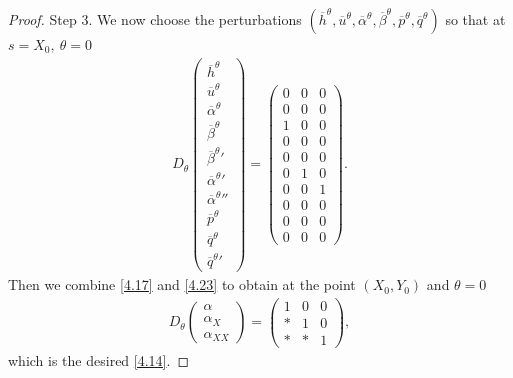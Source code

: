 \documentclass[11pt,reqno]{article}
\numberwithin{equation}{section}
\begin{document}
\begin{proof}
Step 3. We now choose the perturbations $(\overline{h}^\theta, \overline{u}^\theta, \overline{\alpha}^\theta, \overline{\beta}^\theta, \overline{p}^\theta, \overline{q}^\theta)$ so that at $s=X_0,\ \theta=0$
\begin{align*}
D_\theta
\left(
\begin{array}{c}
\overline{h}^\theta \\
\overline{u}^\theta \\
\overline{\alpha}^\theta \\
\overline{\beta}^\theta \\
{\overline{\beta}^{\theta}}' \\
{\overline{\alpha}^{\theta}}' \\
{\overline{\alpha}^{\theta}}'' \\
\overline{p}^\theta \\
\overline{q}^\theta \\
{\overline{q}^{\theta}}'
\end{array}
\right)=
\left(
\begin{array}{ccc}
0 & 0 & 0 \\
0 & 0 & 0 \\
1 & 0 & 0 \\
0 & 0 & 0 \\
0 & 0 & 0 \\
0 & 1 & 0 \\
0 & 0 & 1 \\
0 & 0 & 0 \\
0 & 0 & 0 \\
0 & 0 & 0
\end{array}
\right).
\end{align*}
Then we combine \eqref{4.17} and \eqref{4.23} to obtain at the point $(X_0, Y_0)$ and $\theta=0$
\begin{align*}
D_\theta
\left(
\begin{array}{c}
\alpha \\
\alpha_X \\
\alpha_{XX}
\end{array}
\right)
=\left(
\begin{array}{ccc}
1 & 0 & 0 \\
* & 1 & 0 \\
* & * & 1
\end{array}
\right),
\end{align*}
which is the desired \eqref{4.14}.


\end{proof}
\end{document}
